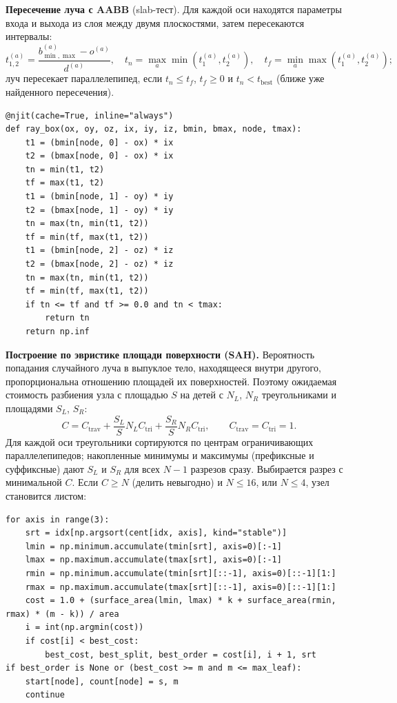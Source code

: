 \documentclass[12pt,a4paper]{article}
\begin{document}
\textbf{Пересечение луча с AABB} (slab-тест). Для каждой оси находятся параметры входа и выхода из слоя между
двумя плоскостями, затем пересекаются интервалы:
\begin{equation}
t_{1,2}^{(a)} = \frac{b^{(a)}_{\min,\max} - o^{(a)}}{d^{(a)}},\quad
t_n = \max_a \min(t_1^{(a)}, t_2^{(a)}),\quad t_f = \min_a \max(t_1^{(a)}, t_2^{(a)});
\end{equation}
луч пересекает параллелепипед, если $t_n\le t_f$, $t_f\ge0$ и $t_n < t_{\text{best}}$ (ближе уже найденного пересечения).

\begin{lstlisting}
@njit(cache=True, inline="always")
def ray_box(ox, oy, oz, ix, iy, iz, bmin, bmax, node, tmax):
    t1 = (bmin[node, 0] - ox) * ix
    t2 = (bmax[node, 0] - ox) * ix
    tn = min(t1, t2)
    tf = max(t1, t2)
    t1 = (bmin[node, 1] - oy) * iy
    t2 = (bmax[node, 1] - oy) * iy
    tn = max(tn, min(t1, t2))
    tf = min(tf, max(t1, t2))
    t1 = (bmin[node, 2] - oz) * iz
    t2 = (bmax[node, 2] - oz) * iz
    tn = max(tn, min(t1, t2))
    tf = min(tf, max(t1, t2))
    if tn <= tf and tf >= 0.0 and tn < tmax:
        return tn
    return np.inf
\end{lstlisting}

\textbf{Построение по эвристике площади поверхности (SAH).} Вероятность попадания случайного луча в выпуклое тело,
находящееся внутри другого, пропорциональна отношению площадей их поверхностей. Поэтому ожидаемая стоимость
разбиения узла с площадью $S$ на детей с $N_L$, $N_R$ треугольниками и площадями $S_L$, $S_R$:
\begin{equation}
C = C_{\text{trav}} + \frac{S_L}{S} N_L C_{\text{tri}} + \frac{S_R}{S} N_R C_{\text{tri}},\qquad C_{\text{trav}} = C_{\text{tri}} = 1.
\end{equation}
Для каждой оси треугольники сортируются по центрам ограничивающих параллелепипедов; накопленные минимумы и максимумы
(префиксные и суффиксные) дают $S_L$ и $S_R$ для всех $N-1$ разрезов сразу. Выбирается разрез с минимальной $C$.
Если $C\ge N$ (делить невыгодно) и $N\le16$, или $N\le4$, узел становится листом:

\begin{lstlisting}
for axis in range(3):
    srt = idx[np.argsort(cent[idx, axis], kind="stable")]
    lmin = np.minimum.accumulate(tmin[srt], axis=0)[:-1]
    lmax = np.maximum.accumulate(tmax[srt], axis=0)[:-1]
    rmin = np.minimum.accumulate(tmin[srt][::-1], axis=0)[::-1][1:]
    rmax = np.maximum.accumulate(tmax[srt][::-1], axis=0)[::-1][1:]
    cost = 1.0 + (surface_area(lmin, lmax) * k + surface_area(rmin, rmax) * (m - k)) / area
    i = int(np.argmin(cost))
    if cost[i] < best_cost:
        best_cost, best_split, best_order = cost[i], i + 1, srt
if best_order is None or (best_cost >= m and m <= max_leaf):
    start[node], count[node] = s, m
    continue
\end{lstlisting}
\end{document}
